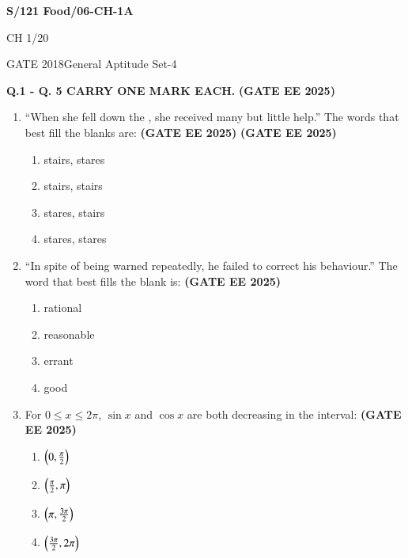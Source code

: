 \documentclass[journal,12pt,onecolumn]{IEEEtran}
\theoremstyle{remark}
\begin{document}
\textbf{S/121 Food/06-CH-1A}

\begin{center}
CH 1/20
\end{center}

\newpage

\begin{center}{GATE 2018}{General Aptitude  Set-4}
\end{center}

\textbf{Q.1 - Q. 5 CARRY ONE MARK EACH.}
\hfill \textbf{(GATE EE 2025)} \begin{enumerate}

	\item ``When she fell down the \underline{\hspace{2cm}}, she received many  \underline{\hspace{2cm}} but little help.''
The words that best fill the blanks are: \hfill \textbf{(GATE EE 2025)} 
\hfill \textbf{(GATE EE 2025)} \begin{enumerate}
    \item stairs, stares
    \item stairs, stairs
    \item stares, stairs
    \item stares, stares
\end{enumerate}


\item ``In spite of being warned repeatedly, he failed to correct his \underline{\hspace{2cm}} behaviour.''
The word that best fills the blank is:
\hfill \textbf{(GATE EE 2025)} \begin{enumerate}
    \item rational
    \item reasonable
    \item errant
    \item good
\end{enumerate}


\item For $0 \le x \le 2\pi$, $\sin x$ and $\cos x$ are both decreasing in the interval:
\hfill \textbf{(GATE EE 2025)} \begin{enumerate}
    \item $\left(0, \frac{\pi}{2}\right)$
    \item $\left(\frac{\pi}{2}, \pi\right)$
    \item $\left(\pi, \frac{3\pi}{2}\right)$
    \item $\left(\frac{3\pi}{2}, 2\pi\right)$
\end{enumerate}



\end{enumerate}
\end{document}
